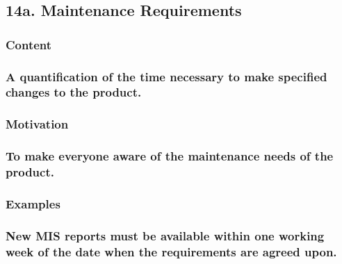 \documentclass[
]{article}
\begin{document}
\hypertarget{a.-maintenance-requirements}{%
\subsection{14a. Maintenance
Requirements}\label{a.-maintenance-requirements}}

\hypertarget{content-49}{%
\subsubsection{Content}\label{content-49}}

\hypertarget{a-quantification-of-the-time-necessary-to-make-specified-changes-to-the-product.}{%
\subsubsection{A quantification of the time necessary to make specified
changes to the
product.}\label{a-quantification-of-the-time-necessary-to-make-specified-changes-to-the-product.}}

\hypertarget{motivation-48}{%
\subsubsection{Motivation}\label{motivation-48}}

\hypertarget{to-make-everyone-aware-of-the-maintenance-needs-of-the-product.}{%
\subsubsection{To make everyone aware of the maintenance needs of the
product.}\label{to-make-everyone-aware-of-the-maintenance-needs-of-the-product.}}

\hypertarget{examples-33}{%
\subsubsection{Examples}\label{examples-33}}

\hypertarget{new-mis-reports-must-be-available-within-one-working-week-of-the-date-when-the-requirements-are-agreed-upon.}{%
\subsubsection{New MIS reports must be available within one working week
of the date when the requirements are agreed
upon.}\label{new-mis-reports-must-be-available-within-one-working-week-of-the-date-when-the-requirements-are-agreed-upon.}}
\end{document}
